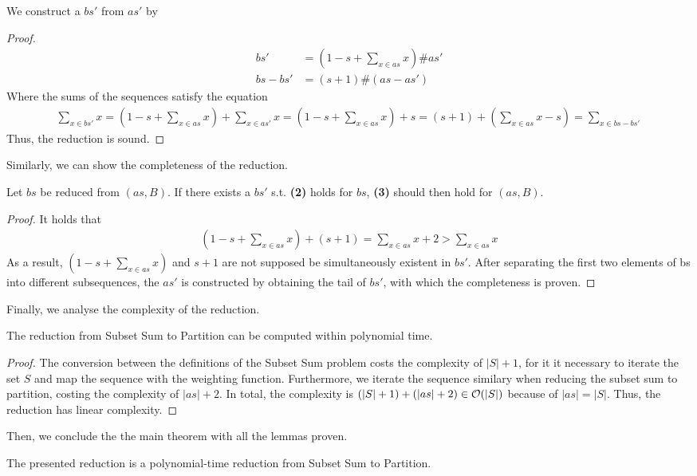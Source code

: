 We construct a $bs'$ from $as'$ by 
\begin{proof}
    \begin{align*}
        bs' &= (1 - s + \sum_{x \in as} x) \# as' \\
        bs - bs' &=  (s + 1) \# (as - as')
    \end{align*}
    Where the sums of the sequences satisfy the equation 
    \begin{align*}
        \sum_{x \in bs'} x = (1 - s + \sum_{x \in as} x) + \sum_{x \in as'} x
        = (1 - s + \sum_{x \in as} x) + s = (s + 1) + (\sum_{x \in as} x - s)
        = \sum_{x \in bs - bs'}
    \end{align*}
    Thus, the reduction is sound.
\end{proof}
Similarly, we can show the completeness of the reduction.
\begin{lemma}[Completeness]
    Let $bs$ be reduced from $(as, B)$. If there exists a $bs'$ s.t. \textbf{(2)} holds for $bs$, 
    \textbf{(3)} should then hold for $(as, B)$.
\end{lemma}
\begin{proof}
    It holds that
\begin{align*}
    (1 - s + \sum_{x \in as} x) + (s + 1) = \sum_{x \in as} x + 2 > \sum_{x \in as} x
\end{align*}
As a result, $(1 - s + \sum_{x \in as} x)$ and $s + 1$ are not supposed be simultaneously existent in $bs'$. 
After separating the first two elements of bs into different subsequences, the $as'$ is constructed 
by obtaining the tail of $bs'$, with which the completeness is proven.
\end{proof} 
Finally, we analyse the complexity of the reduction.
\begin{lemma}
    The reduction from Subset Sum to Partition can be computed within polynomial time.
\end{lemma}
\begin{proof}
The conversion between the definitions of the Subset Sum problem costs the complexity of $|S| + 1$,
for it it necessary to iterate the set $S$ and map the sequence with the weighting function. Furthermore, we iterate the sequence similary when reducing the subset sum to partition, costing
the complexity of $|as| + 2$. In total, the complexity is $(|S| + 1) + (|as| + 2) \in \mathcal{O}({|S|})$  because of $|as| = |S|$.
Thus, the reduction has linear complexity.
\end{proof}
Then, we conclude the the main theorem with all the lemmas proven.
\begin{theorem}
    The presented reduction is a polynomial-time reduction from Subset Sum to Partition.
\end{theorem}
